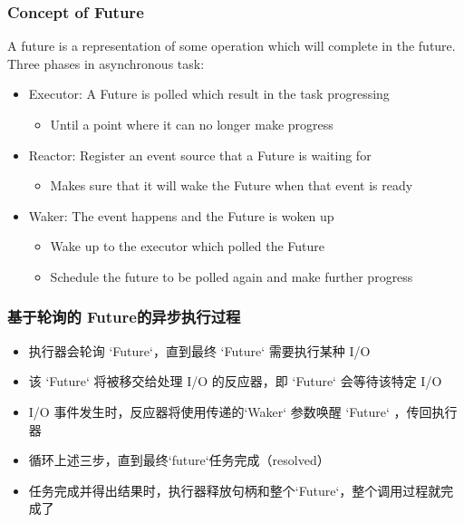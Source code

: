 \begin{frame}[fragile]
    \frametitle{Concept of Future}
% 
% 
A future is a representation of some operation which will complete in the future.
% 
% 
Three phases in asynchronous task:
% 
    \begin{itemize}
        \item {\color{red}Executor}: A Future is polled which result in the task progressing
    	\begin{itemize}
    	    \item Until a point where it can no longer make progress
    	\end{itemize}
        \item {\color{red}Reactor}: Register an event source that a Future is waiting for
    	\begin{itemize}
    	    \item Makes sure that it will wake the Future when that event is ready
    	\end{itemize}
        \item {\color{red}Waker}: The event happens and the Future is woken up
    	\begin{itemize}
    	    \item Wake up to the executor which polled the Future
    	    \item Schedule the future to be polled again and make further progress
    	\end{itemize}
    \end{itemize}
% 
\end{frame}
\begin{frame}[fragile]
    \frametitle{基于轮询的 Future的异步执行过程}
% 
    \begin{itemize}
        \item 执行器会轮询 `Future`，直到最终 `Future` 需要执行某种 I/O 
        \item 该 `Future` 将被移交给处理 I/O 的反应器，即 `Future` 会等待该特定 I/O 
        \item I/O 事件发生时，反应器将使用传递的`Waker` 参数唤醒 `Future` ，传回执行器
        \item 循环上述三步，直到最终`future`任务完成（resolved）
        \item 任务完成并得出结果时，执行器释放句柄和整个`Future`，整个调用过程就完成了
    \end{itemize}
% 
% 
\end{frame}
